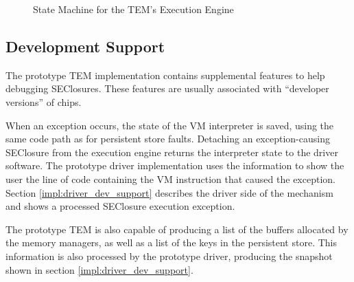 \begin{figure}
	\caption{State Machine for the TEM's Execution Engine}
	\label{fig:exec_states}
\end{figure}


\subsection{Development Support}\label{impl:fw_dev_support}
The prototype TEM implementation contains supplemental features to help
debugging SEClosures. These features are usually associated with ``developer
versions'' of chips.

When an exception occurs, the state of the VM interpreter is saved, using the
same code path as for persistent store faults. Detaching an exception-causing
SEClosure from the execution engine returns the interpreter state to the driver
software. The prototype driver implementation uses the information to show the
user the line of code containing the VM instruction that caused the exception.
Section \ref{impl:driver_dev_support} describes the driver side of the
mechanism and shows a processed SEClosure execution exception.

The prototype TEM is also capable of producing a list of the buffers
allocated by the memory managers, as well as a list of the keys in the
persistent store. This information is also processed by the prototype driver,
producing the snapshot shown in section \ref{impl:driver_dev_support}.

